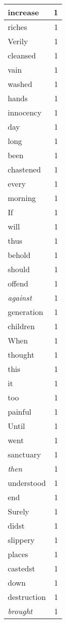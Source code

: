 \begin{center}
\begin{longtable}{l|r}
increase & 1 \\ \hline
riches & 1 \\ \hline
Verily & 1 \\ \hline
cleansed & 1 \\ \hline
vain & 1 \\ \hline
washed & 1 \\ \hline
hands & 1 \\ \hline
innocency & 1 \\ \hline
day & 1 \\ \hline
long & 1 \\ \hline
been & 1 \\ \hline
chastened & 1 \\ \hline
every & 1 \\ \hline
morning & 1 \\ \hline
If & 1 \\ \hline
will & 1 \\ \hline
thus & 1 \\ \hline
behold & 1 \\ \hline
should & 1 \\ \hline
offend & 1 \\ \hline
\emph{against} & 1 \\ \hline
generation & 1 \\ \hline
children & 1 \\ \hline
When & 1 \\ \hline
thought & 1 \\ \hline
this & 1 \\ \hline
it & 1 \\ \hline
too & 1 \\ \hline
painful & 1 \\ \hline
Until & 1 \\ \hline
went & 1 \\ \hline
sanctuary & 1 \\ \hline
\emph{then} & 1 \\ \hline
understood & 1 \\ \hline
end & 1 \\ \hline
Surely & 1 \\ \hline
didst & 1 \\ \hline
slippery & 1 \\ \hline
places & 1 \\ \hline
castedst & 1 \\ \hline
down & 1 \\ \hline
destruction & 1 \\ \hline
\emph{brought} & 1 \\ \hline

\end{longtable}
\end{center}
